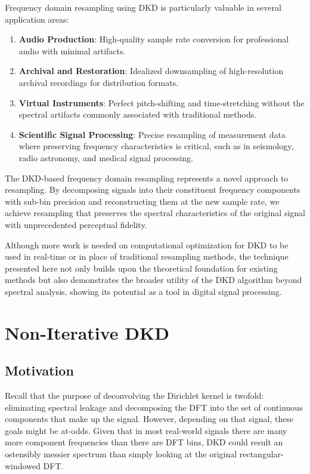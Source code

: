 \documentclass[11pt,twoside]{report}
\numberwithin{thm}{section}
\numberwithin{equation}{section}
\begin{document}
Frequency domain resampling using DKD is particularly valuable in several application areas:

\begin{enumerate}
    \item \textbf{Audio Production}: High-quality sample rate conversion for professional audio with minimal artifacts.
    
    \item \textbf{Archival and Restoration}: Idealized downsampling of high-resolution archival recordings for distribution formats.
    
    \item \textbf{Virtual Instruments}: Perfect pitch-shifting and time-stretching without the spectral artifacts commonly associated with traditional methods.
    
    \item \textbf{Scientific Signal Processing}: Precise resampling of measurement data where preserving frequency characteristics is critical, such as in seismology, radio astronomy, and medical signal processing.
\end{enumerate}

The DKD-based frequency domain resampling represents a novel approach to resampling. By decomposing signals into their constituent frequency components with sub-bin precision and reconstructing them at the new sample rate, we achieve resampling that preserves the spectral characteristics of the original signal with unprecedented perceptual fidelity. 

Although more work is needed on computational optimization for DKD to be used in real-time or in place of traditional resampling methods, the technique presented here not only builds upon the theoretical foundation for existing methods but also demonstrates the broader utility of the DKD algorithm beyond spectral analysis, showing its potential as a tool in digital signal processing.

\section{Non-Iterative DKD}
\label{sec:dkdni}
\subsection{Motivation}
Recall that the purpose of deconvolving the Dirichlet kernel is twofold: eliminating spectral leakage and decomposing the DFT into the set of continuous components that make up the signal. However, depending on that signal, these goals might be at-odds. Given that in most real-world signals there are many more component frequencies than there are DFT bins, DKD could result an ostensibly messier spectrum than simply looking at the original rectangular-windowed DFT. 
\end{document}
